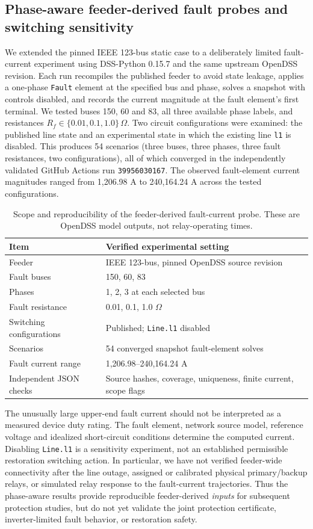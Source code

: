 \subsection{Phase-aware feeder-derived fault probes and switching sensitivity}
\label{sec:feeder-fault-probes}
We extended the pinned IEEE 123-bus static case to a deliberately limited fault-current experiment using DSS-Python 0.15.7 and the same upstream OpenDSS revision. Each run recompiles the published feeder to avoid state leakage, applies a one-phase \texttt{Fault} element at the specified bus and phase, solves a snapshot with controls disabled, and records the current magnitude at the fault element's first terminal. We tested buses 150, 60 and 83, all three available phase labels, and resistances \(R_f\in\{0.01,0.1,1.0\}\,\Omega\). Two circuit configurations were examined: the published line state and an experimental state in which the existing line \texttt{l1} is disabled. This produces 54 scenarios (three buses, three phases, three fault resistances, two configurations), all of which converged in the independently validated GitHub Actions run \texttt{39956030167}. The observed fault-element current magnitudes ranged from 1,206.98 A to 240,164.24 A across the tested configurations.

\begin{table}[H]
\centering
\caption{Scope and reproducibility of the feeder-derived fault-current probe. These are OpenDSS model outputs, not relay-operating times.}
\label{tab:feeder-fault-probes}
\begin{tabular}{ll}\toprule
Item & Verified experimental setting\\\midrule
Feeder & IEEE 123-bus, pinned OpenDSS source revision\\
Fault buses & 150, 60, 83\\
Phases & 1, 2, 3 at each selected bus\\
Fault resistance & 0.01, 0.1, 1.0 \(\Omega\)\\
Switching configurations & Published; \texttt{Line.l1} disabled\\
Scenarios & 54 converged snapshot fault-element solves\\
Fault current range & 1,206.98--240,164.24 A\\
Independent JSON checks & Source hashes, coverage, uniqueness, finite current, scope flags\\\bottomrule
\end{tabular}
\end{table}
The unusually large upper-end fault current should not be interpreted as a measured device duty rating. The fault element, network source model, reference voltage and idealized short-circuit conditions determine the computed current. Disabling \texttt{Line.l1} is a sensitivity experiment, not an established permissible restoration switching action. In particular, we have not verified feeder-wide connectivity after the line outage, assigned or calibrated physical primary/backup relays, or simulated relay response to the fault-current trajectories. Thus the phase-aware results provide reproducible feeder-derived \emph{inputs} for subsequent protection studies, but do not yet validate the joint protection certificate, inverter-limited fault behavior, or restoration safety.
